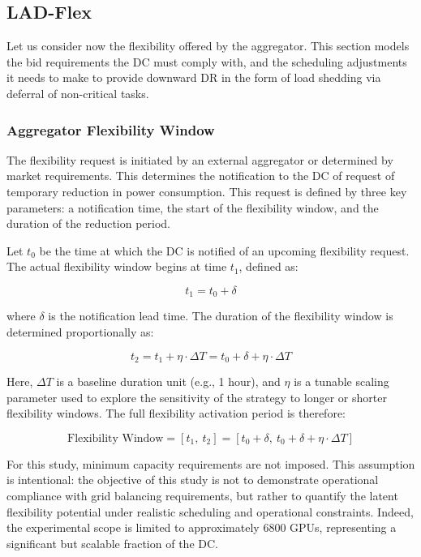 \documentclass[preprint,12pt]{elsarticle}
\begin{document}
\subsection{LAD-Flex} \label{LAD-Flex_section}
Let us consider now the flexibility offered by the aggregator. This section models the bid requirements the DC must comply with, and the scheduling adjustments it needs to make to provide downward DR in the form of load shedding via deferral of non-critical tasks.

\subsubsection{Aggregator Flexibility Window}

The flexibility request is initiated by an external aggregator or determined by market requirements. This determines the notification to the DC of request of temporary reduction in power consumption. This request is defined by three key parameters: a notification time, the start of the flexibility window, and the duration of the reduction period.

Let \( t_0 \) be the time at which the DC is notified of an upcoming flexibility request. The actual flexibility window begins at time \( t_1 \), defined as:

\begin{equation}
    t_1 = t_0 + \delta
\end{equation}


where \( \delta \) is the notification lead time. The duration of the flexibility window is determined proportionally as:

\begin{equation}
    t_2 = t_1 + \eta \cdot \Delta T = t_0 + \delta + \eta \cdot \Delta T
\end{equation}

Here, \( \Delta T \) is a baseline duration unit (e.g., 1 hour), and \( \eta \) is a tunable scaling parameter used to explore the sensitivity of the strategy to longer or shorter flexibility windows. The full flexibility activation period is therefore:

\begin{equation}
    \text{Flexibility Window} = [t_1,\ t_2] = [t_0 + \delta,\ t_0 + \delta + \eta \cdot \Delta T]
\end{equation}

For this study, minimum capacity requirements are not imposed. This assumption is intentional: the objective of this study is not to demonstrate operational compliance with grid balancing requirements, but rather to quantify the latent flexibility potential under realistic scheduling and operational constraints. Indeed, the experimental scope is limited to approximately 6800 GPUs, representing a significant but scalable fraction of the DC. 
\end{document}
